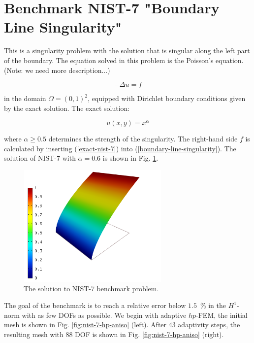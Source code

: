 \section{Benchmark NIST-7 "Boundary Line Singularity"}
\label{sec:bench-7}

This is a singularity problem with the solution that is singular along the left part of the boundary.
The equation solved in this problem is the Poisson's equation. (Note: we need more description...)

\begin{equation} \label{boundary-line-singularity}
-\Delta u = f
\end{equation}

in the domain $\Omega = (0, 1)^2$, equipped with Dirichlet boundary conditions
given by the exact solution. The exact solution: 

\begin{equation}\label{exact-nist-7}
u(x,y) = x^{\alpha}
\end{equation}

where $\alpha \geq 0.5$ determines the strength of the singularity.
The right-hand side $f$ is calculated by inserting (\ref{exact-nist-7}) into (\ref{boundary-line-singularity}).
The solution of NIST-7 with $\alpha = 0.6$ is shown in Fig. \ref{fig:sln-nist07}.

\begin{figure}[!ht]
\centering
\includegraphics[height=6cm]{nist/nist-7/solution.png}
\caption{The solution to NIST-7 benchmark problem.}
\label{fig:sln-nist07}
\end{figure}

The goal of the benchmark is to reach a relative error below
$1.5$~\% in the $H^1$-norm with as few DOFs as possible.
We begin with adaptive $hp$-FEM, 
the initial mesh is shown in Fig. \ref{fig:nist-7-hp-aniso} (left).
After 43 adaptivity steps, the resulting mesh with 88 DOF is shown 
in Fig. \ref{fig:nist-7-hp-aniso} (right).

